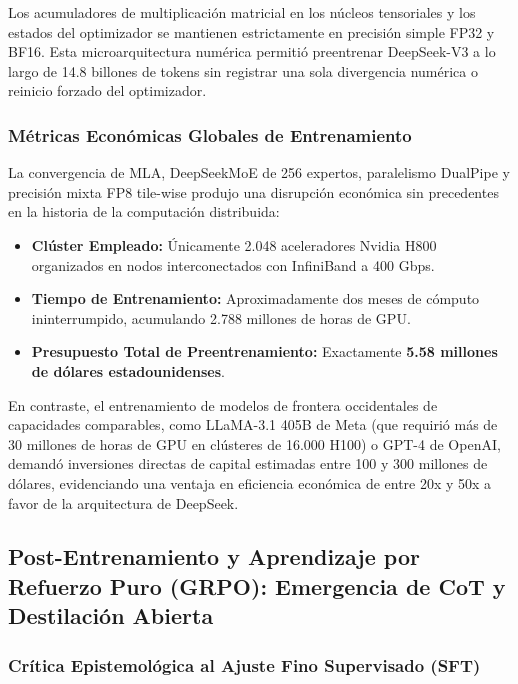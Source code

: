 Los acumuladores de multiplicación matricial en los núcleos tensoriales y los estados del optimizador se mantienen estrictamente en precisión simple FP32 y BF16. Esta microarquitectura numérica permitió preentrenar DeepSeek-V3 a lo largo de 14.8 billones de tokens sin registrar una sola divergencia numérica o reinicio forzado del optimizador.

\subsubsection{Métricas Económicas Globales de Entrenamiento}

La convergencia de MLA, DeepSeekMoE de 256 expertos, paralelismo DualPipe y precisión mixta FP8 tile-wise produjo una disrupción económica sin precedentes en la historia de la computación distribuida:
\begin{itemize}
    \item \textbf{Clúster Empleado:} Únicamente 2.048 aceleradores Nvidia H800 organizados en nodos interconectados con InfiniBand a 400 Gbps.
    \item \textbf{Tiempo de Entrenamiento:} Aproximadamente dos meses de cómputo ininterrumpido, acumulando 2.788 millones de horas de GPU.
    \item \textbf{Presupuesto Total de Preentrenamiento:} Exactamente \textbf{5.58 millones de dólares estadounidenses}.
\end{itemize}

En contraste, el entrenamiento de modelos de frontera occidentales de capacidades comparables, como LLaMA-3.1 405B de Meta (que requirió más de 30 millones de horas de GPU en clústeres de 16.000 H100) o GPT-4 de OpenAI, demandó inversiones directas de capital estimadas entre 100 y 300 millones de dólares, evidenciando una ventaja en eficiencia económica de entre 20x y 50x a favor de la arquitectura de DeepSeek.

\vspace{0.4cm}

\subsection{Post-Entrenamiento y Aprendizaje por Refuerzo Puro (GRPO): Emergencia de CoT y Destilación Abierta}

\subsubsection{Crítica Epistemológica al Ajuste Fino Supervisado (SFT)}

